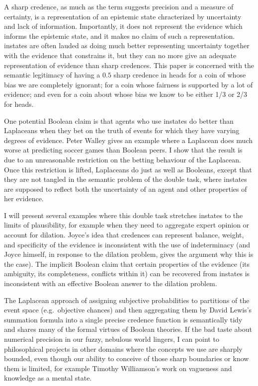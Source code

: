 \documentclass[11pt]{article}
\begin{document}
A sharp credence, as much as the term suggests precision and a measure
of certainty, is a representation of an epistemic state chracterized
by uncertainty and lack of information. Importantly, it does not
represent the evidence which informs the epistemic state, and it makes
no claim of such a representation. instates are often lauded as doing
much better representing uncertainty together with the evidence that
constrains it, but they can no more give an adequate representation of
evidence than sharp credences. This paper is concerned with the
semantic legitimacy of having a $0.5$ sharp credence in heads for a
coin of whose bias we are completely ignorant; for a coin whose
fairness is supported by a lot of evidence; and even for a coin about
whose bias we know to be either 1/3 or 2/3 for heads.

One potential Boolean claim is that agents who use instates do better
than Laplaceans when they bet on the truth of events for which they
have varying degrees of evidence. Peter Walley gives an example where
a Laplacean does much worse at predicting soccer games than Boolean
peers. I show that the result is due to an unreasonable restriction on
the betting behaviour of the Laplacean. Once this restriction is
lifted, Laplaceans do just as well as Booleans, except that they are
not tangled in the semantic problem of the double task, where instates
are supposed to reflect both the uncertainty of an agent and other
properties of her evidence.

I will present several examples where this double task stretches
instates to the limits of plausibility, for example when they need to
aggregate expert opinion or account for dilation. Joyce's idea that
credences can represent balance, weight, and specificity of the
evidence is inconsistent with the use of indeterminacy (and Joyce
himself, in response to the dilation problem, gives the argument why
this is the case). The implicit Boolean claim that certain properties
of the evidence (its ambiguity, its completeness, conflicts within it)
can be recovered from instates is inconsistent with an effective
Boolean answer to the dilation problem.

The Laplacean approach of assigning subjective probabilities to
partitions of the event space (e.g.\ objective chances) and then
aggregating them by David Lewis's summation formula into a single
precise credence function is semantically tidy and shares many of the
formal virtues of Boolean theories. If the bad taste about numerical
precision in our fuzzy, nebulous world lingers, I can point to
philosophical projects in other domains where the concepts we use are
sharply bounded, even though our ability to conceive of those sharp
boundaries or know them is limited, for example Timothy Williamson's
work on vagueness and knowledge as a mental state.
\end{document}
